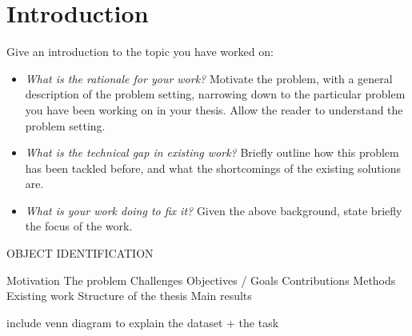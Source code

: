 %


\chapter{Introduction}
Give an introduction to the topic you have worked on:

\begin{itemize}
 \item \textit{What is the rationale for your work?} Motivate the problem, \eg with a general description of the problem setting, narrowing down to the particular problem you have been working on in your thesis. Allow the reader to understand the problem setting. 
 \item \textit{What is the technical gap in existing work?} Briefly outline how this problem has been tackled before, and what the shortcomings of the existing solutions are.
 \item \textit{What is your work doing to fix it?} Given the above background, state briefly the focus of the work. 
\end{itemize}

OBJECT IDENTIFICATION

Motivation
The problem
Challenges
Objectives / Goals
Contributions
Methods
Existing work
Structure of the thesis
Main results

include venn diagram to explain the dataset + the task